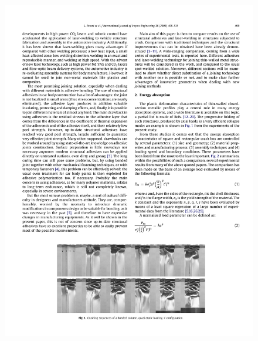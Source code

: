 \documentclass[
documentsize = a4, %
font = cmr, %
typesize = 11, %
printmode = true,
onehalfspacing = true,
language = en, %
titlepage = udciccp, %
degree = pt, %
dedication = true,
acknowledgements = true,
abstract-en = true,
abstract-es = false,
abstract-ga = false,
epigraphs = true,
toc = true,
lof = true,
lot = true,
frontmatterintoc = false,
notation = false,
minimal = false,
]{UDCthesis}
\begin{document}
\begin{figure}
\begin{minipage}[b]{.23\linewidth}
		\includegraphics[width=\linewidth]{IMG_CUTRES/peroni_trig}
	\end{minipage}
	\quad
	\begin{minipage}[b]{.45\linewidth}
		\centering

\end{minipage}
\end{figure}
\end{document}
